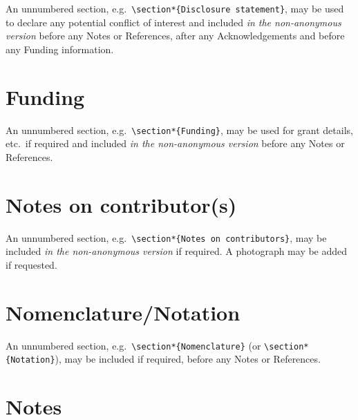 \documentclass[]{interact}
\theoremstyle{plain}%
\theoremstyle{definition}
\theoremstyle{remark}
\begin{document}
An unnumbered section, e.g.\ \verb"\section*{Disclosure statement}", may be used to declare any potential conflict of interest and included \emph{in the non-anonymous version} before any Notes or References, after any Acknowledgements and before any Funding information.


\section*{Funding}

An unnumbered section, e.g.\ \verb"\section*{Funding}", may be used for grant details, etc.\ if required and included \emph{in the non-anonymous version} before any Notes or References.


\section*{Notes on contributor(s)}

An unnumbered section, e.g.\ \verb"\section*{Notes on contributors}", may be included \emph{in the non-anonymous version} if required. A photograph may be added if requested.


\section*{Nomenclature/Notation}

An unnumbered section, e.g.\ \verb"\section*{Nomenclature}" (or \verb"\section*{Notation}"), may be included if required, before any Notes or References.


\section*{Notes}
\end{document}
